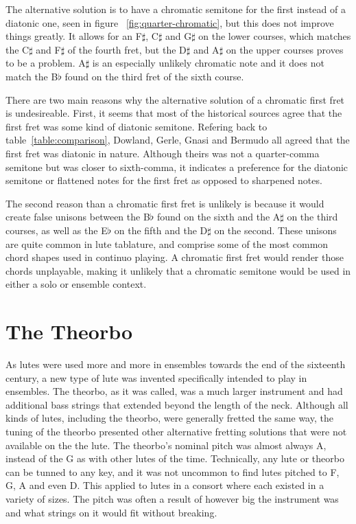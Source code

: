 The alternative solution is to have a chromatic semitone for the first instead of a
diatonic one, seen in figure ~\ref{fig:quarter-chromatic}, but this does not improve
things greatly.  It allows for an F$\sharp$, C$\sharp$
and G$\sharp$ on the lower courses, which matches the C$\sharp$ and F$\sharp$ of the
fourth fret, but the D$\sharp$ and A$\sharp$ on the upper courses proves to be a problem.
A$\sharp$ is an especially unlikely chromatic note and it does not match the B$\flat$
found on the third fret of the sixth course.

There are two main reasons why the alternative solution of a chromatic first fret is
undesireable. First, it seems that most of the historical sources agree that the first
fret was some kind of diatonic semitone.  Refering back to table~\ref{table:comparison},
Dowland, Gerle, Gnasi and Bermudo all agreed that the first fret was diatonic in nature.
Although theirs was not a quarter-comma semitone but was closer to sixth-comma, it
indicates a preference for the diatonic semitone or flattened notes for the first fret as
opposed to sharpened notes.

The second reason than a chromatic first fret is unlikely is because it would create false
unisons between the B$\flat$ found on the sixth and the A$\sharp$ on the third courses, as
well as the E$\flat$ on the fifth and the D$\sharp$ on the second. These unisons are quite
common in lute tablature, and comprise some of the most common chord shapes used in
continuo playing.  A chromatic first fret would render those chords unplayable, making it
unlikely that a chromatic semitone would be used in either a solo or ensemble context.

\section{The Theorbo}

As lutes were used more and more in ensembles towards the end of the sixteenth century, a
new type of lute was invented specifically intended to play in ensembles.  The theorbo, as
it was called, was a much larger instrument and had additional bass strings that extended
beyond the length of the neck.  Although all kinds of lutes, including the theorbo, were
generally fretted the same way, the tuning of the theorbo presented other alternative
fretting solutions that were not available on the the lute.  The theorbo's nominal pitch
was almost always A, instead of the G as with other lutes of the time.  Technically, any
lute or theorbo can be tunned to any key, and it was not uncommon to find lutes pitched to
F, G, A and even D.  This applied to lutes in a consort where each existed in a variety of
sizes.  The pitch was often a result of however big the instrument was and what strings on
it would fit without breaking.

